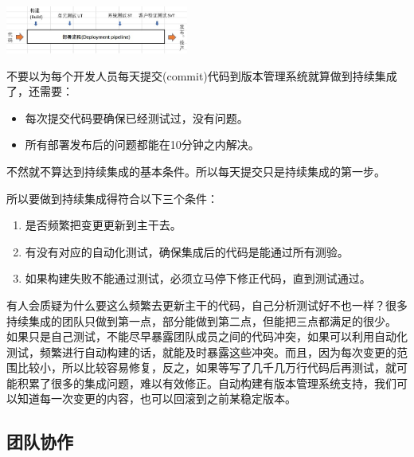 
\includegraphics[width=6cm]{!DeployPipelineScreenshot_2022-05-20_210104.jpg}

不要以为每个开发人员每天提交(commit)代码到版本管理系统就算做到持续集成了，还需要：

\begin{itemize}
\tightlist
\item
  每次提交代码要确保已经测试过，没有问题。
\item
  所有部署发布后的问题都能在10分钟之内解决。
\end{itemize}

不然就不算达到持续集成的基本条件。所以每天提交只是持续集成的第一步。

所以要做到持续集成得符合以下三个条件：

\begin{enumerate}
\tightlist
\item
  是否频繁把变更更新到主干去。
\item
  有没有对应的自动化测试，确保集成后的代码是能通过所有测验。
\item
  如果构建失败不能通过测试，必须立马停下修正代码，直到测试通过。\\
\end{enumerate}

有人会质疑为什么要这么频繁去更新主干的代码，自己分析测试好不也一样？很多持续集成的团队只做到第一点，部分能做到第二点，但能把三点都满足的很少。\\
如果只是自己测试，不能尽早暴露团队成员之间的代码冲突，如果可以利用自动化测试，频繁进行自动构建的话，就能及时暴露这些冲突。而且，因为每次变更的范围比较小，所以比较容易修复，反之，如果等写了几千几万行代码后再测试，就可能积累了很多的集成问题，难以有效修正。自动构建有版本管理系统支持，我们可以知道每一次变更的内容，也可以回滚到之前某稳定版本。

\hypertarget{ux56e2ux961fux534fux4f5c}{%
\subsection{团队协作}\label{ux56e2ux961fux534fux4f5c}}

